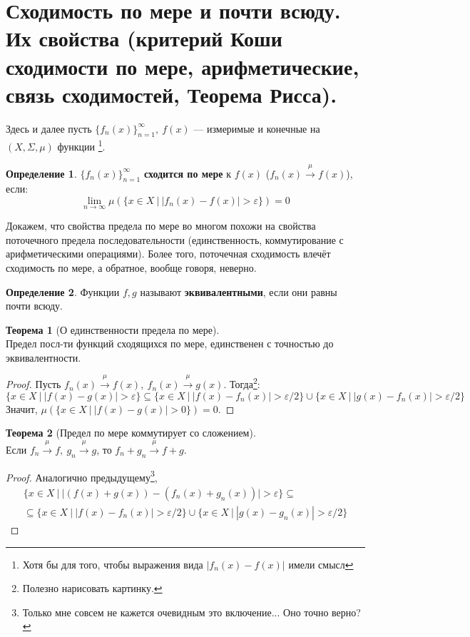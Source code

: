 \documentclass[11pt,a4paper]{report}
\def\eps{\varepsilon}
\theoremstyle{definition}
\theoremstyle{definition}
\newtheorem{theorem}{Теорема}[section]
\theoremstyle{definition}
\newtheorem{definition}{Определение}[section]
\begin{document}
	\section{Сходимость по мере и почти всюду. Их свойства (критерий Коши сходимости по мере, арифметические, связь сходимостей, Теорема Рисса).}
		Здесь и далее пусть $ \{f_{n}(x)\}_{n=1}^{\infty},\ f(x) $ — измеримые и конечные на $ (X, \Sigma, \mu) $ функции \footnote{Хотя бы для того, чтобы выражения вида $ |f_{n}(x) - f(x)| $ имели смысл}.
		\begin{definition}
			$ \{f_{n}(x)\}_{n=1}^{\infty} $ \textbf{сходится по мере} к $ f(x) $ ($ f_{n}(x) \xrightarrow{\mu} f(x) $), если:\
			\[ \lim\limits_{n\to\infty}{\mu(\{x \in X\ |\ |f_{n}(x) - f(x)| > \eps\})} = 0 \]
		\end{definition}
		\noindent Докажем, что свойства предела по мере во многом похожи на свойства поточечного предела последовательности (единственность, коммутирование с арифметическими операциями). Более того, поточечная сходимость влечёт сходимость по мере, а обратное, вообще говоря, неверно. 
		\begin{definition}
			Функции $ f, g $ называют \textbf{эквивалентными}, если они равны почти всюду.
		\end{definition}
		\begin{theorem}[О единственности предела по мере]$  $\\
			Предел посл-ти функций сходящихся по мере, единственен с точностью до эквивалентности.
		\end{theorem}
		\begin{proof}
			Пусть $ f_{n}(x) \xrightarrow{\mu} f(x),\ f_{n}(x) \xrightarrow{\mu} g(x) $. Тогда\footnote{Полезно нарисовать картинку.}:
			\[ \{x \in X\ |\ |f(x) - g(x)| > \eps \} \subseteq \{x \in X\ |\ |f(x) - f_{n}(x)| >  \eps/2 \} \cup \{x \in X\ |\ |g(x) - f_{n}(x)| > \eps/2 \} \]
			Значит, $ \mu(\{x \in X\ |\ |f(x) - g(x)| > 0 \}) = 0  $.
		\end{proof}
		\begin{theorem}[Предел по мере коммутирует со сложением]$  $\\
			Если $ f_{n} \xrightarrow{\mu} f,\ g_{n} \xrightarrow{\mu} g $, то $ f_{n} + g_{n} \xrightarrow{\mu} f + g $.
		\end{theorem}
		\begin{proof}
			Аналогично предыдущему\footnote{Только мне совсем не кажется очевидным это включение... Оно точно верно?},
			\begin{gather*} 
				\{x \in X\ |\ |(f(x) + g(x)) - (f_{n}(x) + g_{n}(x))| > \eps \} \subseteq\\\subseteq \{x \in X\ |\ |f(x) - f_{n}(x)| >  \eps/2 \} \cup \{x \in X\ |\ |g(x) - g_{n}(x)| > \eps/2 \}
			\end{gather*}
		\end{proof}
\end{document}
